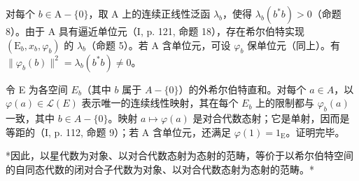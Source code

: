 对每个 \(b \in \mathrm{A} - \{0\}\)，取 A 上的连续正线性泛函 \(\lambda_b\)，使得 \(\lambda_b(b^*b) > 0\)（命题 8）。由于 A 具有逼近单位元（I, p. 121, 命题 18），存在希尔伯特实现 \((\mathrm{E}_b, x_b, \varphi_b)\) 的 \(\lambda_b\)（命题 5）。若 A 含单位元，可设 \(\varphi_b\) 保单位元（同上）。有 \(\| \varphi_b(b) \|^2 = \lambda_b(b^*b) \neq 0\)。

令 E 为各空间 \(E_{b}\)（其中 \(b\) 属于 \(A - \{0\}\)）的外希尔伯特直和。对每个 \(a \in A\)，以 \(\varphi(a) \in \mathcal{L}(E)\) 表示唯一的连续线性映射，其在每个 \(E_{b}\) 上的限制都与 \(\varphi_{b}(a)\) 一致，其中 \(b \in A - \{0\}\)。映射 \(a \mapsto \varphi(a)\) 是对合代数态射；它是单射，因而是等距的（I, p. 112, 命题 9）；若 A 含单位元，还满足 \(\varphi(1) = 1_{\mathrm{E}}\)。证明完毕。

*因此，以星代数为对象、以对合代数态射为态射的范畴，等价于以希尔伯特空间的自同态代数的闭对合子代数为对象、以对合代数态射为态射的范畴。*

